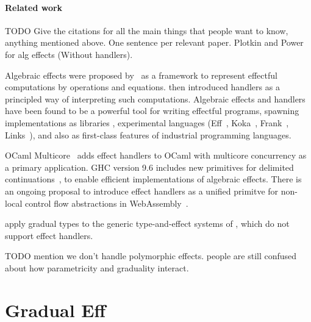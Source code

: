 \paragraph{Related work}

TODO Give the citations for all the main things that people want to know, anything mentioned above.
One sentence per relevant paper. Plotkin and Power for alg effects (Without handlers).

Algebraic effects were proposed by~\citet{plotkin-power-2001} as a framework
to represent effectful computations by operations and equations.
\citet{plotkin-pretnar-2009} then introduced handlers as a principled way
of interpreting such computations. Algebraic effects and handlers have been found
to be a powerful tool for writing effectful programs, spawning implementations
as libraries \citep{kammar2013handlers},
experimental languages (Eff~\citep{bauer-pretnar-2014}, Koka~\citep{leijen04}, Frank~\citep{dobedo}, Links~\citep{hillerstrom2016}),
and also as first-class features of industrial programming languages.


OCaml Multicore~\citep{dolan-2015} adds effect handlers to OCaml with
multicore concurrency as a primary application.
GHC version 9.6 includes new primitives for delimited continuations~\citep{ghc-delcont},
to enable efficient implementations of algebraic effects.
There is an ongoing proposal to introduce effect handlers as a unified primitve
for non-local control flow abstractions in WebAssembly~\citep{wasmfx}.

\citet{schwerter-2016} apply gradual types to the generic type-and-effect systems of \citet{marino-2009},
which do not support effect handlers.

TODO mention we don't handle polymorphic effects.
people are still confused about how parametricity and graduality interact.

\section{Gradual Eff}

\GEmetavars\\[0pt]
\GEgrammar\\[5.0mm]
\GEdefnss

